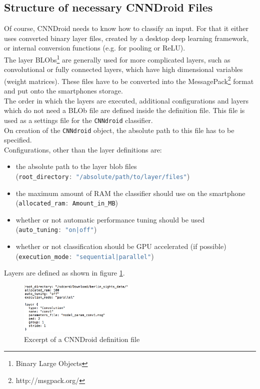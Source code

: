 \subsection{Structure of necessary CNNDroid Files}
Of course, CNNDroid needs to know how to classify an input. For that it either uses converted binary layer files, created by a desktop deep learning framework, or internal conversion functions (e.g. for pooling or ReLU).\\
The layer BLObs\footnote{Binary Large Objects} are generally used for more complicated layers, such as convolutional or fully connected layers, which have high dimensional variables (weight matrices). These files have to be converted into the MessagePack\footnote{http://msgpack.org/} format and put onto the smartphones storage.\\
The order in which the layers are executed, additional configurations and layers which do not need a BLOb file are defined inside the definition file. This file is used as a settings file for the \lstinline[language=Java]{CNNdroid} classifier.\\
On creation of the \lstinline[language=Java]{CNNdroid} object, the absolute path to this file has to be specified.\\
Configurations, other than the layer definitions are:
\begin{itemize}
    \item{the absolute path to the layer blob files\\(\lstinline[language=Java]{root_directory: "/absolute/path/to/layer/files"})}
    \item{the maximum amount of RAM the classifier should use on the smartphone\\(\lstinline[language=Java]{allocated_ram: Amount_in_MB})}
    \item{whether or not automatic performance tuning should be used\\(\lstinline[language=Java]{auto_tuning: "on|off"})}
    \item{whether or not classification should be GPU accelerated (if possible)\\(\lstinline[language=Java]{execution_mode: "sequential|parallel"})}
\end{itemize}
Layers are defined as shown in figure \ref{fig:def_file}.

\begin{figure}[H]
  \centering
    \includegraphics[width=0.5\textwidth]{def_file.png}
  \caption{Excerpt of a CNNDroid definition file}
  \label{fig:def_file}
\end{figure}


